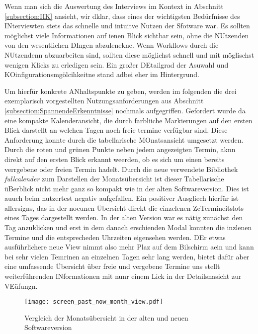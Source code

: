 Wenn man sich die Auswertung des Interviews im Kontext in Abschnitt
\ref{subsection:IIK} ansieht, wir dklar, dass eines der wichtigsten Bedürfnisse
des INterviewten stets das schnelle und intuitve Nutzen der Sfotware war. Es
sollten möglichst viele Informationen auf ienen Blick sichtbar sein, ohne die
NUtzenden von den wesentlichen DIngen abzulenekne. Wenn Workflows durch die
NUtzendenn abzuarbeiten sind, sollten diese möglichst schnell und mit
möglischst wenigen Klicks zu erledigen sein. Ein großer DEtailgrad der Asuwahl
und KOinfigurationsmgölcihkeitne stand adbei eher im Hintergrund.

Um hierfür konkrete ANhaltspunkte zu geben, werden im folgenden die drei
exemplarisch vorgestellten Nutzungsanforderungen aus Abschnitt
\ref{subsection:SpannendeErkenntnisse} nochmals aufgegriffen. Gefordert wurde
da eine kompakte Kalenderansicht, die durch farbliiche Markierungen auf den
ersten Blick darstellt an welchen Tagen noch freie termine verfügbar sind.
Diese Anforderung konnte durch die tabellarische MOnatsansicht umgesetzt
werden. Durch die roten und grünen Punkte neben jedem angezeigten Termin, aknn
direkt auf den ersten Blick erkannt weerden, ob es sich um einen bereits
verrgebene oder freien Termin hadelt. Durch die neue verwendete Bibliothek
\textit{fullcalender} zum Darstellen der Monatsübersicht ist dieser
Tabellarische üBerblick nicht mehr ganz so kompakt wie in der alten
Softwareversion. Dies ist auuch \ipName beim nutzertest negativ aufgefallen.
Ein positiver Ausgliech hierfür ist allersigns, das in der noeunen Übersicht
direkt die einzelenen ZeTermineitslots eines Tages dargestellt werden. In der
alten Version war es nätig zunächst den Tag anzuklicken und erst in dem danach
erschienden Modal konnten die inzlenen Termine und die entsprecheden Uhrzeiten
eigensehen werden. DEr etwas ausführlichere neue View nimmt also mehr Plaz auf
dem Bilschirm aein und kann bei sehr vielen Temrinen an einzelnen Tagen sehr
lang werden, bietet dafür aber eine umfassende Übersicht über freie und
vergebene Termine uns stellt weiterführenden INformationen mit nunr einem Lick
in der Detailsnasicht zur VEüfungn.

\begin{figure}[H]
    \caption{Vergleich der Monatsübersicht in der alten und neuen Softwareversion}
    \centering
    \texttt{[image: screen\_past\_now\_month\_view.pdf]}
\end{figure}

